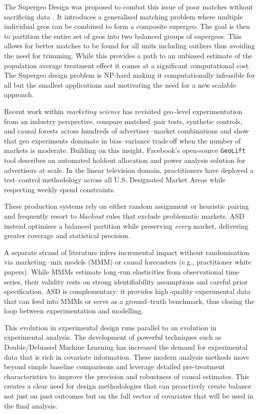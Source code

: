 \documentclass[final,3p,fleqn, 10pt]{elsarticle}
\begin{document}
The Supergeo Design was proposed to combat this issue of poor matches without sacrificing data \citep{chen2023}. It introduces a generalised matching problem where multiple individual geos can be combined to form a composite supergeo. The goal is then to partition the entire set of geos into two balanced groups of supergeos. This allows for better matches to be found for all units including outliers thus avoiding the need for trimming. While this provides a path to an unbiased estimate of the population average treatment effect it comes at a significant computational cost. The Supergeo design problem is NP-hard making it computationally infeasible for all but the smallest applications and motivating the need for a new scalable approach.

Recent work within \emph{marketing science} has revisited geo\,-level experimentation from an industry perspective. \citet{gordon2021advertising} compare matched--pair tests, synthetic controls, and causal forests across hundreds of advertiser\,–market combinations and show that geo experiments dominate in bias--variance trade\,off when the number of markets is moderate. Building on this insight, Facebook's open-source \texttt{GeoLift} tool describes an automated holdout allocation and power analysis solution for advertisers at scale. In the linear television domain, practitioners have deployed a test--control methodology across all U.S. Designated Market Areas while respecting weekly spend constraints.

These production systems rely on either random assignment or heuristic pairing and frequently resort to \emph{blackout} rules that exclude problematic markets. ASD instead optimises a balanced partition while preserving \emph{every} market, delivering greater coverage and statistical precision.

A separate strand of literature infers incremental impact without randomisation via marketing\,–mix models (MMM) or causal forecasters (e.g., practitioner white papers). While MMMs estimate long\,-run elasticities from observational time series, their validity rests on strong identifiability assumptions and careful prior specification. ASD is complementary: it provides high\,-quality experimental data that can feed into MMMs or serve as a ground\,-truth benchmark, thus closing the loop between experimentation and modelling.

This evolution in experimental design runs parallel to an evolution in experimental analysis. The development of powerful techniques such as Double/Debiased Machine Learning \citep{chernozhukov2018debiased} has increased the demand for experimental data that is rich in covariate information. These modern analysis methods move beyond simple baseline comparisons and leverage detailed pre-treatment characteristics to improve the precision and robustness of causal estimates. This creates a clear need for design methodologies that can proactively create balance not just on past outcomes but on the full vector of covariates that will be used in the final analysis.
\end{document}
